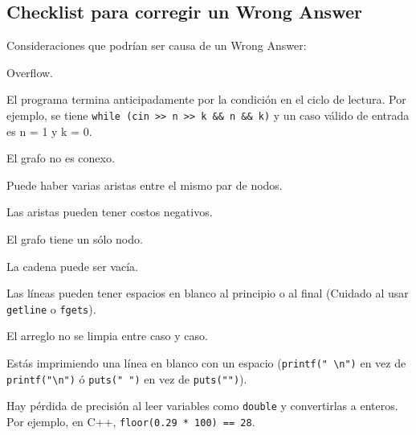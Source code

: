 \documentclass[10pt,letterpaper,twocolumn]{article}
\begin{document}
\subsection{Checklist para corregir un Wrong Answer}
Consideraciones que podrían ser causa de un Wrong Answer:
\begin{itemize}
  \begin{item}
    Overflow.
  \end{item}

  \begin{item}
    El programa termina anticipadamente por la condición en el ciclo de lectura.
    Por ejemplo, se tiene \verb_while (cin >> n >> k && n && k)_ y un caso válido de entrada
    es n = 1 y k = 0.
  \end{item}

  \begin{item}
    El grafo no es conexo.
  \end{item}

  \begin{item}
    Puede haber varias aristas entre el mismo par de nodos.
  \end{item}

  \begin{item}
    Las aristas pueden tener costos negativos.
  \end{item}

  \begin{item}
    El grafo tiene un sólo nodo.
  \end{item}

  \begin{item}
    La cadena puede ser vacía.
  \end{item}

  \begin{item}
    Las líneas pueden tener espacios en blanco al principio o al final (Cuidado al usar \texttt{getline} o \texttt{fgets}).
  \end{item}

  \begin{item}
    El arreglo no se limpia entre caso y caso.
  \end{item}

  \begin{item}
    Estás imprimiendo una línea en blanco con un espacio (\verb_printf(" \n")_ en vez de \verb_printf("\n")_  ó \verb_puts(" ")_  en vez de \verb_puts("")_).
  \end{item}

  \begin{item}
    Hay pérdida de precisión al leer variables como \verb_double_ y convertirlas a enteros. Por ejemplo, en C++, \verb_floor(0.29 * 100) == 28_.
  \end{item}


\end{itemize}
\end{document}
